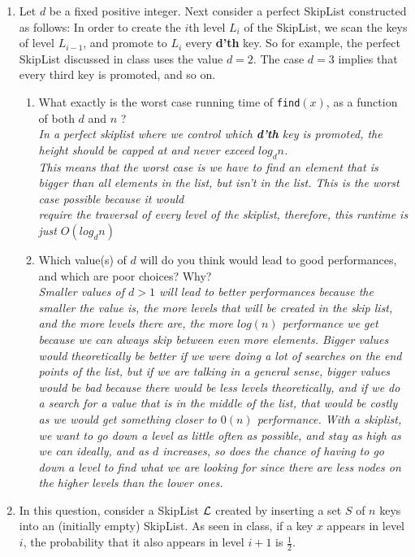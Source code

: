 \documentclass[11pt,epic,leqno,eepic,psfig,]{article}
\newcommand{\ans}[1]{{\color{brown}{\bf\Large Answer:} \sl  #1 \color{black}}}
\renewcommand{\i}{\item}
\begin{document}
\begin{enumerate}
\begin{enumerate}
\i  Let $d$ be a fixed positive integer.
Next consider a perfect SkipList constructed  as follows:  In order to create the $i$th level $L_i$ of the SkipList, we scan the  keys  of  level $L_{i-1}$, and promote to $L_i$ every {\bf d'th} key.
So for example, the perfect SkipList discussed in class uses the value $d=2$. The case   $d=3$ implies that every third key is promoted, and so on.
\begin{enumerate}

\i What exactly is the worst case running time of {\tt find}$(x)$, as a function of both $d$ and $n$ ?
\\\ans{In a perfect skiplist where we control which {\bf d'th} key is promoted, the height should be capped at and never exceed $log_dn$.
\\ This means that the worst case is we have to find an element that is bigger than all elements in the list, but isn't in the list. This is the worst case possible because it would
\\ require the traversal of every level of the skiplist, therefore, this runtime is just $O(log_dn)$ }

\i   Which  value(s) of $d$ will do you think would lead to  good performances, and which are poor choices? Why?
\\\ans{Smaller values of $d > 1$ will lead to better performances because the smaller the value is, the more levels that will be created in the skip list, and the more levels there are,
the more $log(n)$ performance we get because we can always skip between even more elements. Bigger values would theoretically be better if we were doing a lot of searches
on the end points of the list, but if we are talking in a general sense, bigger values would be bad because there would be less levels theoretically, and if we do a search for a value that is
in the middle of the list, that would be costly as we would get something closer to $0(n)$ performance. With a skiplist, we want to go down a level as little often as possible, and stay as high as we can ideally, and as $d$ increases, so does the chance of having to go down a level to find what we are looking for since there are less nodes on the higher levels than the lower ones.}


\end{enumerate}


\i In this question, consider a SkipList ${\cal L}$  created by inserting a set $S$ of $n$  keys into an (initially empty) SkipList.  As seen in class, if a key $x$ appears in level $i$, the probability that it also appears in level $i+1$ is $\frac {1}{2}$.


\end{enumerate}
\end{enumerate}
\end{document}
